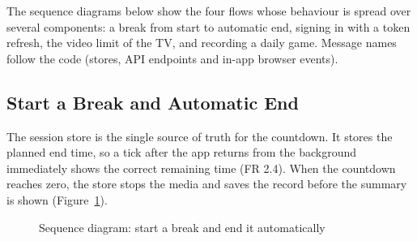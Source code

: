 The sequence diagrams below show the four flows whose behaviour is spread over
several components: a break from start to automatic end, signing in with a
token refresh, the video limit of the TV, and recording a daily game. Message
names follow the code (stores, API endpoints and in-app browser events).

\subsection{Start a Break and Automatic End}
\label{sec:seq-break}

The session store is the single source of truth for the countdown. It stores
the planned end time, so a tick after the app returns from the background
immediately shows the correct remaining time (FR 2.4). When the countdown
reaches zero, the store stops the media and saves the record before the
summary is shown (Figure~\ref{fig:seq-break}).

\begin{figure}[H]
\centering
{}
\caption{Sequence diagram: start a break and end it automatically}
\label{fig:seq-break}
\end{figure}

